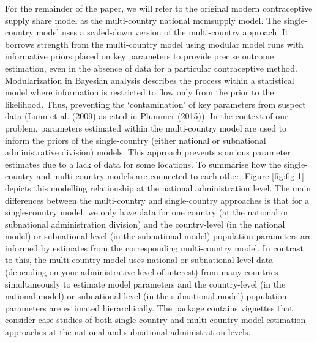 For the remainder of the paper, we will refer to the original modern contraceptive supply share model as the multi-country national mcmsupply model. The single-country  model uses a scaled-down version of the multi-country approach. It borrows strength from the multi-country model using modular model runs with informative priors placed on key parameters to provide precise outcome estimation, even in the absence of data for a particular contraceptive method. Modularization in Bayesian analysis describes the process within a statistical model where information is restricted to flow only from the prior to the likelihood. Thus, preventing the `contamination' of key parameters from suspect data (Lunn et al. (2009) as cited in Plummer (2015)). In the context of our problem, parameters estimated within the multi-country model are used to inform the priors of the single-country (either national or subnational administrative division) models. This approach prevents spurious parameter estimates due to a lack of data for some locations. To summarise how the single-country and multi-country models are connected to each other, Figure \ref{fig:fig-1} depicts this modelling relationship at the national administration level. The main differences between the multi-country and single-country approaches is that for a single-country model, we only have data for one country (at the national or subnational administration division) and the country-level (in the national model) or subnational-level (in the subnational model) population parameters are informed by estimates from the corresponding multi-country model. In contrast to this, the multi-country model uses national or subnational level data (depending on your administrative level of interest) from many countries simultaneously to estimate model parameters and the country-level (in the national model) or subnational-level (in the subnational model) population parameters are estimated hierarchically. The  package contains vignettes that consider case studies of both single-country and multi-country model estimation approaches at the national and subnational administration levels.

